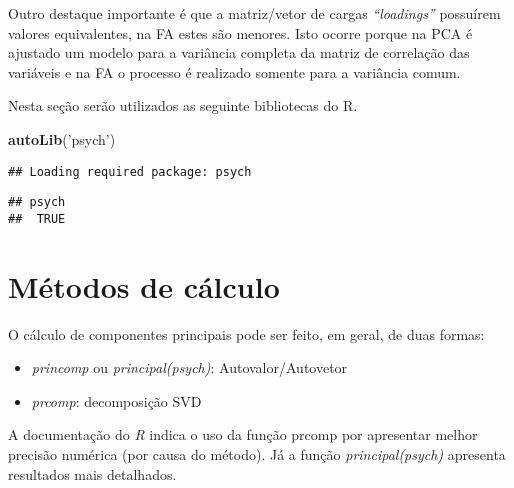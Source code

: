 \documentclass[]{book}
\newenvironment{Shaded}{\begin{snugshade}}{\end{snugshade}}
\newcommand{\KeywordTok}[1]{\textcolor[rgb]{0.13,0.29,0.53}{\textbf{{#1}}}}
\newcommand{\DataTypeTok}[1]{\textcolor[rgb]{0.13,0.29,0.53}{{#1}}}
\newcommand{\DecValTok}[1]{\textcolor[rgb]{0.00,0.00,0.81}{{#1}}}
\newcommand{\StringTok}[1]{\textcolor[rgb]{0.31,0.60,0.02}{{#1}}}
\newcommand{\NormalTok}[1]{{#1}}
\providecommand{\tightlist}{%
  \setlength{\itemsep}{0pt}\setlength{\parskip}{0pt}}
\begin{document}
Outro destaque importante é que a matriz/vetor de cargas
\emph{``loadings''} possuírem valores equivalentes, na FA estes são
menores. Isto ocorre porque na PCA é ajustado um modelo para a variância
completa da matriz de correlação das variáveis e na FA o processo é
realizado somente para a variância comum.

Nesta seção serão utilizados as seguinte bibliotecas do R.

\begin{Shaded}
\begin{Highlighting}[]
\KeywordTok{autoLib}\NormalTok{(}\StringTok{'psych'}\NormalTok{)}
\end{Highlighting}
\end{Shaded}

\begin{verbatim}
## Loading required package: psych
\end{verbatim}

\begin{verbatim}
## psych 
##  TRUE
\end{verbatim}

\begin{Shaded}
\end{Shaded}

\section{Métodos de cálculo}\label{metodos-de-calculo}

O cálculo de componentes principais pode ser feito, em geral, de duas
formas:

\begin{itemize}
\tightlist
\item
  \emph{princomp} ou \emph{principal(psych)}: Autovalor/Autovetor
\item
  \emph{prcomp}: decomposição SVD
\end{itemize}

A documentação do \emph{R} indica o uso da função prcomp por apresentar
melhor precisão numérica (por causa do método). Já a função
\emph{principal(psych)} apresenta resultados mais detalhados.
\end{document}
